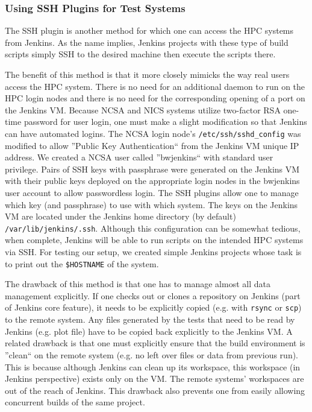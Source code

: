 \documentclass[10pt, conference, compsocconf]{IEEEtran}
\begin{document}
\subsubsection{Using SSH Plugins for Test Systems}
The SSH plugin \cite{JenkinsSSHPlugin} is another method for which one can access the HPC systems from Jenkins. 
As the name implies, Jenkins projects with these type of build scripts simply SSH to the desired machine then execute the scripts there. 


The benefit of this method is that it more closely mimicks the way real users access the HPC system. 
There is no need for an additional daemon to run on the HPC login nodes and there is no need for the corresponding opening of a port on the Jenkins VM. 
Because NCSA and NICS systems utilize two-factor RSA one-time password for user login, one must make a slight modification so that Jenkins can have automated logins. 
The NCSA login node's \texttt{/etc/ssh/sshd_config} was modified to allow ''Public Key Authentication`` from the Jenkins VM unique IP address. 
We created a NCSA user called ''bwjenkins`` with standard user privilege. 
Pairs of SSH keys with passphrase were generated on the Jenkins VM with their public keys deployed on the appropriate login nodes in the bwjenkins user account to allow passwordless login. 
The SSH plugins allow one to manage which key (and passphrase) to use with which system. 
The keys on the Jenkins VM are located under the Jenkins home directory (by default) \texttt{/var/lib/jenkins/.ssh}. 
Although this configuration can be somewhat tedious, when complete, Jenkins will be able to run scripts on the intended HPC systems via SSH. 
For testing our setup, we created simple Jenkins projects whose task is to print out the \texttt{\$HOSTNAME} of the system.

The drawback of this method is that one has to manage almost all data management explicitly. 
If one checks out or clones a repository on Jenkins (part of Jenkins core feature), it needs to be explicitly copied (e.g. with \texttt{rsync} or \texttt{scp}) to the remote system. 
Any files generated by the tests that need to be read by Jenkins (e.g. plot file) have to be copied back explicitly to the Jenkins VM. 
A related drawback is that one must explicitly ensure that the build environment is ''clean`` on the remote system (e.g. no left over files or data from previous run). 
This is because although Jenkins can clean up its workspace, this workspace (in Jenkins perspective) exists only on the VM. 
The remote systems' workspaces are out of the reach of Jenkins. 
This drawback also prevents one from easily allowing concurrent builds of the same project. 
\end{document}
